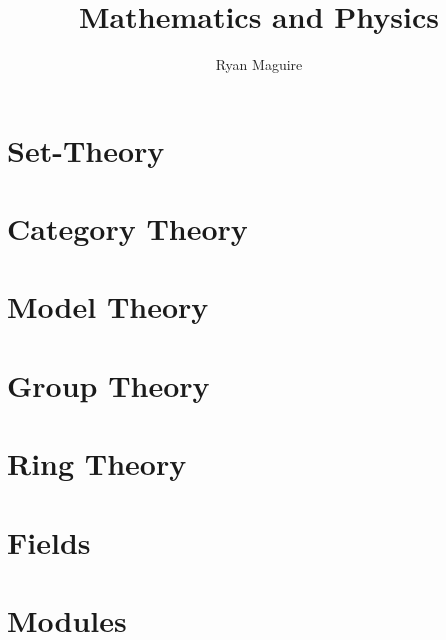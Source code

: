 \documentclass[oneside]{book}                                                  %
\title{Mathematics and Physics}                                                %
\author{Ryan Maguire}                                                          %
\date{\vspace{-5ex}}                                                           %
\newcommand*{\TOPPATH}{books}
\newcommand*{\PATH}{\TOPPATH/}
\newcounter{endpage}
\begin{document}
    \maketitle
    \tableofcontents
    \listoffigures
    \listoftables
    \clearpage
        \renewcommand{\PATH}{\TOPPATH/Foundations}
        \part{Set-Theory}
            
        \part{Category Theory}
            
        \part{Model Theory}
            
    \clearpage

    \setcounter{endpage}{\thepage}
        \renewcommand{\PATH}{\TOPPATH/Algebra}
        \setcounter{page}{\value{endpage}}
        \part{Group Theory}
            
        \part{Ring Theory}
            
        \part{Fields}
            
        \part{Modules}
            
    \clearpage
\end{document}
